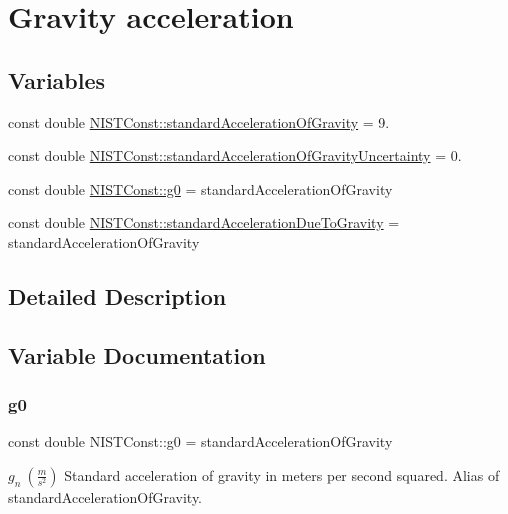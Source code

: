 \hypertarget{group___gravity_acceleration}{}\section{Gravity acceleration}
\label{group___gravity_acceleration}
\subsection*{Variables}
\begin{DoxyCompactItemize}
\item 
const double \hyperlink{group___gravity_acceleration_gad5bc5f7f030bc2c467a8430e00b42f5e}{N\+I\+S\+T\+Const\+::standard\+Acceleration\+Of\+Gravity} = 9.
\item 
const double \hyperlink{group___gravity_acceleration_gaabc6df92c25677a5b767445f101d4f57}{N\+I\+S\+T\+Const\+::standard\+Acceleration\+Of\+Gravity\+Uncertainty} = 0.
\item 
const double \hyperlink{group___gravity_acceleration_ga1fd0cec0a449e40eb603ac6292027924}{N\+I\+S\+T\+Const\+::g0} = standard\+Acceleration\+Of\+Gravity
\item 
const double \hyperlink{group___gravity_acceleration_ga7d417cb0027680e48ff481ab68a0864e}{N\+I\+S\+T\+Const\+::standard\+Acceleration\+Due\+To\+Gravity} = standard\+Acceleration\+Of\+Gravity
\end{DoxyCompactItemize}


\subsection{Detailed Description}


\subsection{Variable Documentation}
\mbox{\label{group___gravity_acceleration_ga1fd0cec0a449e40eb603ac6292027924}} 
\subsubsection{\texorpdfstring{g0}{g0}}
{\footnotesize\ttfamily const double N\+I\+S\+T\+Const\+::g0 = standard\+Acceleration\+Of\+Gravity}

$g_n \ (\frac{m}{s^2})$ Standard acceleration of gravity in meters per second squared. Alias of standard\+Acceleration\+Of\+Gravity. \mbox{\label{group___gravity_acceleration_ga7d417cb0027680e48ff481ab68a0864e}} 
